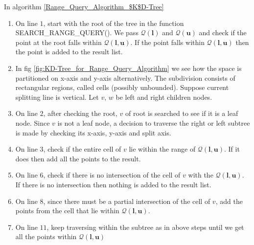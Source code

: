 In algorithm \ref{Range_Query_Algorithm_$K$D-Tree} 

\begin{enumerate}
    \item On line $1$, start with the root of the tree in the function SEARCH\_RANGE\_QUERY(). We pass $\mathcal{Q}(\boldsymbol{l})$ and $\mathcal{Q}(\boldsymbol{u})$ and check if the point at the root falls within $\mathcal{Q}(\boldsymbol{l}, \boldsymbol{u})$. If the point falls within $\mathcal{Q}(\boldsymbol{l}, \boldsymbol{u})$ then the point is added to the result list.
    
    \item In fig \ref{fig:KD-Tree_for_Range_Query_Algorithm} we see how the space is partitioned on x-axis and y-axis alternatively. The subdivision consists of rectangular regions, called cells (possibly unbounded). Suppose current splitting line is vertical. Let $v$, $w$ be left and right children nodes. 
    
    \item On line $2$, after checking the root, $v$ of root is searched to see if it is a leaf node. Since $v$ is not a leaf node, a decision to traverse the right or left subtree is made by checking its x-axis, y-axis and split axis. 
    
    \item On line $3$, check if the entire cell of $v$ lie within the range of $\mathcal{Q}(\boldsymbol{l}, \boldsymbol{u})$. If it does then add all the points to the result.
    
    \item On line $6$, check if there is no intersection of the cell of $v$ with the $\mathcal{Q}(\boldsymbol{l}, \boldsymbol{u})$. If there is no intersection then nothing is added to the result list.
    
    \item On line $8$, since there must be a partial intersection of the cell of $v$, add the points from the cell that lie within $\mathcal{Q}(\boldsymbol{l}, \boldsymbol{u})$. 
    
    \item On line $11$, keep traversing within the subtree as in above steps until we get all the points within $\mathcal{Q}(\boldsymbol{l}, \boldsymbol{u})$
\end{enumerate}

